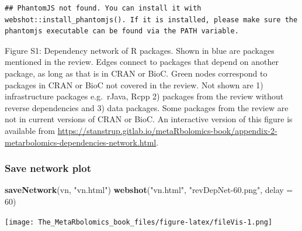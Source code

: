 \documentclass[]{article}
\newenvironment{Shaded}{\begin{snugshade}}{\end{snugshade}}
\newcommand{\DataTypeTok}[1]{\textcolor[rgb]{0.13,0.29,0.53}{#1}}
\newcommand{\DecValTok}[1]{\textcolor[rgb]{0.00,0.00,0.81}{#1}}
\newcommand{\KeywordTok}[1]{\textcolor[rgb]{0.13,0.29,0.53}{\textbf{#1}}}
\newcommand{\NormalTok}[1]{#1}
\newcommand{\StringTok}[1]{\textcolor[rgb]{0.31,0.60,0.02}{#1}}
\begin{document}
\begin{verbatim}
## PhantomJS not found. You can install it with webshot::install_phantomjs(). If it is installed, please make sure the phantomjs executable can be found via the PATH variable.
\end{verbatim}

\hypertarget{htmlwidget-395324bb74e92368dfba}{}

Figure S1: Dependency network of R packages. Shown in blue are packages mentioned in the review. Edges connect to packages that depend on another package, as long as that is in CRAN or BioC. Green nodes correspond to packages in CRAN or BioC not covered in the review. Not shown are 1) infrastructure packages e.g.~rJava, Rcpp 2) packages from the review without reverse dependencies and 3) data packages. Some packages from the review are not in current versions of CRAN or BioC. An interactive version of this figure is available from \href{appendix-2-metarbolomics-dependencies-network.html}{https://stanstrup.gitlab.io/metaRbolomics-book/appendix-2-metarbolomics-dependencies-network.html}.

\hypertarget{save-network-plot}{%
\subsubsection*{Save network plot}\label{save-network-plot}}

\begin{Shaded}
\begin{Highlighting}[]
\KeywordTok{saveNetwork}\NormalTok{(vn, }\StringTok{"vn.html"}\NormalTok{)}
\KeywordTok{webshot}\NormalTok{(}\StringTok{"vn.html"}\NormalTok{, }\StringTok{"revDepNet-60.png"}\NormalTok{, }\DataTypeTok{delay =} \DecValTok{60}\NormalTok{)}
\end{Highlighting}
\end{Shaded}

\texttt{[image: The\_MetaRbolomics\_book\_files/figure-latex/fileVis-1.png]}
\end{document}
